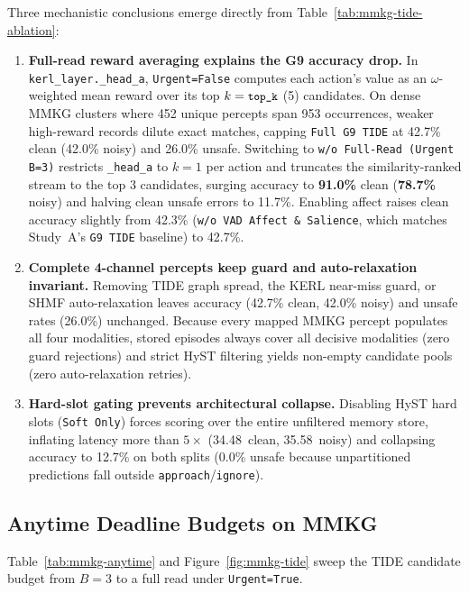 \documentclass[12pt,a4paper,oneside]{report}
\newcommand{\code}[1]{\texttt{\small #1}}
\newcommand{\ms}{\,\text{ms}}
\begin{document}
\noindent Three mechanistic conclusions emerge directly from Table~\ref{tab:mmkg-tide-ablation}:
\begin{enumerate}
  \item \textbf{Full-read reward averaging explains the G9 accuracy drop.} In \code{kerl\_layer.\_head\_a}, \code{Urgent=False} computes each action's value as an $\omega$-weighted mean reward over its top $k=\code{top\_k}$ (5) candidates. On dense MMKG clusters where 452 unique percepts span 953 occurrences, weaker high-reward records dilute exact matches, capping \code{Full G9 TIDE} at 42.7\% clean (42.0\% noisy) and 26.0\% unsafe. Switching to \code{w/o Full-Read (Urgent B=3)} restricts \code{\_head\_a} to $k=1$ per action and truncates the similarity-ranked stream to the top 3 candidates, surging accuracy to \textbf{91.0\%} clean (\textbf{78.7\%} noisy) and halving clean unsafe errors to 11.7\%. Enabling affect raises clean accuracy slightly from 42.3\% (\code{w/o VAD Affect \& Salience}, which matches Study~A's \code{G9 TIDE} baseline) to 42.7\%.
  \item \textbf{Complete 4-channel percepts keep guard and auto-relaxation invariant.} Removing TIDE graph spread, the KERL near-miss guard, or SHMF auto-relaxation leaves accuracy (42.7\% clean, 42.0\% noisy) and unsafe rates (26.0\%) unchanged. Because every mapped MMKG percept populates all four modalities, stored episodes always cover all decisive modalities (zero guard rejections) and strict HyST filtering yields non-empty candidate pools (zero auto-relaxation retries).
  \item \textbf{Hard-slot gating prevents architectural collapse.} Disabling HyST hard slots (\code{Soft Only}) forces scoring over the entire unfiltered memory store, inflating latency more than $5\times$ (34.48\ms{} clean, 35.58\ms{} noisy) and collapsing accuracy to 12.7\% on both splits (0.0\% unsafe because unpartitioned predictions fall outside \code{approach}/\code{ignore}).
\end{enumerate}

\subsection{Anytime Deadline Budgets on MMKG}
Table~\ref{tab:mmkg-anytime} and Figure~\ref{fig:mmkg-tide} sweep the TIDE candidate budget from $B=3$ to a full read under \code{Urgent=True}.
\end{document}
